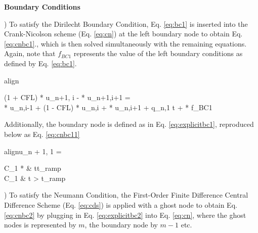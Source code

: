 \documentclass[10pt, letter, showtrims]{extarticle}
\newcommand{\boxedeq}[2]{\begin{empheq}[box={\fboxsep=6pt\fbox}]{align}\label{#1}#2\end{empheq}}
\begin{document}
		\pagebreak
		
		\noindent
		\textbf{Boundary Conditions}
		
		) To satisfy the Dirilecht Boundary Condition, Eq. \ref{eq:bc1} is inserted into the Crank-Nicolson scheme (Eq. \ref{eq:cn}) at the left boundary node to obtain Eq. \ref{eq:cnbc1}., which is then solved simultaneously with the remaining equations. Again, note that $f_{BC1}$ represents the value of the left boundary conditions as defined by Eq. \ref{eq:bc1}.
		
%		
%
		
		\boxedeq{eq:cnbc1}{\begin{split}(1 + CFL) * u_{n+1, i} -  * u_{n+1,i+1} = \\ \frac{CFL}{2} * u_{n,i-1} + (1 - CFL) * u_{n,i} + \frac{CFL}{2} * u_{n,i+1} + q_{n,1} \Delta t + \frac{CFL}{2} * f_{BC1}\end{split}}    		
    		
    		\noindent
		Additionally, the boundary node is defined as in Eq. \ref{eq:explicitbc1}, reproduced below as Eq. \ref{eq:cnbc11}
		
		\boxedeq{eq:cnbc11}{u_{n + 1, 1} = \begin{cases} 
          			C_{1} * \frac{t}{t_{ramp}} & t\leq t_{ramp} \\
          			C_{1}                      & t > t_{ramp}
       			\end{cases}}
       			
		) To satisfy the Neumann Condition, the First-Order Finite Difference Central Difference Scheme (Eq. \ref{eq:cds}) is applied with a ghost node to obtain Eq. \ref{eq:cnbc2} by plugging in Eq. \ref{eq:explicitbc2} into Eq. \ref{eq:cn}, where the ghost nodes is represented by $m$, the boundary node by $m-1$ etc.
		 
\end{document}
